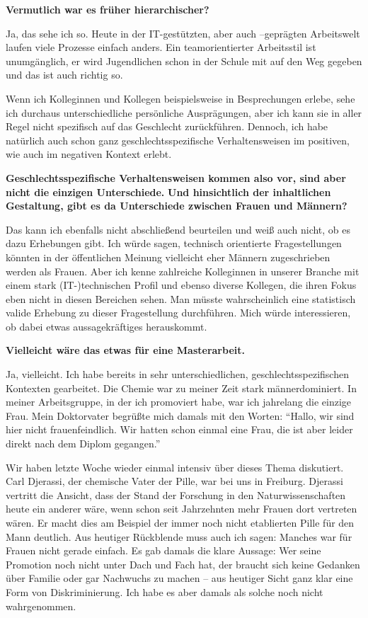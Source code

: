 \documentclass[a4paper,
fontsize=11pt,
oneside,
numbers=noperiodatend,
parskip=half-,
bibliography=totoc,
final
]{scrartcl}
\begin{document}
\textbf{Vermutlich war es früher hierarchischer?}

Ja, das sehe ich so. Heute in der IT-gestützten, aber auch --geprägten
Arbeitswelt laufen viele Prozesse einfach anders. Ein teamorientierter
Arbeitsstil ist unumgänglich, er wird Jugendlichen schon in der Schule
mit auf den Weg gegeben und das ist auch richtig so.~

Wenn ich Kolleginnen und Kollegen beispielsweise in Besprechungen
erlebe, sehe ich durchaus unterschiedliche persönliche Ausprägungen,
aber ich kann sie in aller Regel nicht spezifisch auf das Geschlecht
zurückführen. Dennoch, ich habe natürlich auch schon ganz
geschlechtsspezifische Verhaltensweisen im positiven, wie auch im
negativen Kontext erlebt.~

\textbf{Geschlechtsspezifische Verhaltensweisen kommen also vor, sind
aber nicht die einzigen Unterschiede.} \textbf{Und hinsichtlich der
inhaltlichen Gestaltung, gibt es da Unterschiede zwischen Frauen und
Männern?}

Das kann ich ebenfalls nicht abschließend beurteilen und weiß auch
nicht, ob es dazu Erhebungen gibt. Ich würde sagen, technisch
orientierte Fragestellungen könnten in der öffentlichen Meinung
vielleicht eher Männern zugeschrieben werden als Frauen. Aber ich kenne
zahlreiche Kolleginnen in unserer Branche mit einem stark
(IT-)technischen Profil und ebenso diverse Kollegen, die ihren Fokus
eben nicht in diesen Bereichen sehen. Man müsste wahrscheinlich eine
statistisch valide Erhebung zu dieser Fragestellung durchführen. Mich
würde interessieren, ob dabei etwas aussagekräftiges herauskommt.~

\textbf{Vielleicht wäre das etwas für eine Masterarbeit.}

Ja, vielleicht. Ich habe bereits in sehr unterschiedlichen,
geschlechtsspezifischen Kontexten gearbeitet. Die Chemie war zu meiner
Zeit stark männerdominiert. In meiner Arbeitsgruppe, in der ich
promoviert habe, war ich jahrelang die einzige Frau. Mein Doktorvater
begrüßte mich damals mit den Worten: \enquote{Hallo, wir sind hier nicht
frauenfeindlich. Wir hatten schon einmal eine Frau, die ist aber leider
direkt nach dem Diplom gegangen.}~

Wir haben letzte Woche wieder einmal intensiv über dieses Thema
diskutiert. Carl Djerassi, der chemische Vater der Pille, war bei uns in
Freiburg. Djerassi vertritt die Ansicht, dass der Stand der Forschung in
den Naturwissenschaften heute ein anderer wäre, wenn schon seit
Jahrzehnten mehr Frauen dort vertreten wären. Er macht dies am Beispiel
der immer noch nicht etablierten Pille für den Mann deutlich. Aus
heutiger Rückblende muss auch ich sagen: Manches war für Frauen nicht
gerade einfach. Es gab damals die klare Aussage: Wer seine Promotion
noch nicht unter Dach und Fach hat, der braucht sich keine Gedanken über
Familie oder gar Nachwuchs zu machen -- aus heutiger Sicht ganz klar
eine Form von Diskriminierung. Ich habe es aber damals als solche noch
nicht wahrgenommen.~
\end{document}
